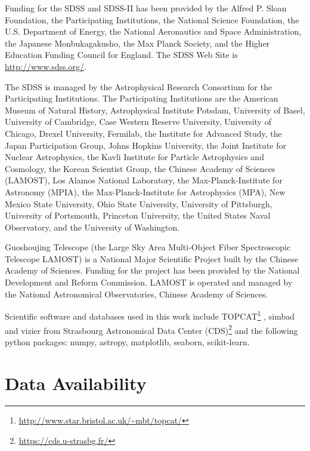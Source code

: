 \documentclass[fleqn,usenatbib]{mnras}
\begin{document}
Funding for the SDSS and SDSS-II has been provided by the Alfred P.
Sloan Foundation, the Participating Institutions, the National Science
Foundation, the U.S. Department of Energy, the National Aeronautics
and Space Administration, the Japanese Monbukagakusho, the Max
Planck Society, and the Higher Education Funding Council for England.
The SDSS Web Site is \url{http://www.sdss.org/}.

The SDSS is managed by the Astrophysical Research Consortium for
the Participating Institutions. The Participating Institutions
are the American Museum of Natural History, Astrophysical Institute Potsdam,
University of Basel, University of Cambridge, Case Western Reserve University,
University of Chicago, Drexel University, Fermilab, the Institute for Advanced
Study, the Japan Participation Group, Johns Hopkins University, the Joint
Institute for Nuclear Astrophysics, the Kavli Institute for Particle Astrophysics
and Cosmology, the Korean Scientist Group, the Chinese Academy of Sciences (LAMOST),
Los Alamos National Laboratory, the Max-Planck-Institute for Astronomy (MPIA),
the Max-Planck-Institute for Astrophysics (MPA), New Mexico State University,
Ohio State University, University of Pittsburgh, University of Portsmouth,
Princeton University, the United States Naval Observatory, and the University
of Washington.

Guoshoujing Telescope (the Large Sky Area Multi-Object Fiber Spectroscopic
Telescope LAMOST) is a National Major Scientific Project built by the Chinese
Academy of Sciences. Funding for the project has been provided by the National
Development and Reform Commission. LAMOST is operated and managed by the
National Astronomical Observatories, Chinese Academy of Sciences. 

Scientific software
and databases used in this work include 
TOPCAT\footnote{\url{http://www.star.bristol.ac.uk/~mbt/topcat/}} \citep{Taylor:2005}, 
simbad and vizier from Strasbourg Astronomical Data Center (CDS)\footnote{\url{https://cds.u-strasbg.fr/}} 
and the following  python packages: numpy, astropy, matplotlib, seaborn, scikit-learn.

\section*{Data Availability}



\end{document}
